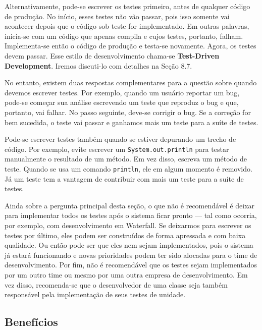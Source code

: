 \documentclass[
  11pt,
  twoside]{book}
\newcommand{\passthrough}[1]{#1}
\begin{document}
Alternativamente, pode-se escrever os testes primeiro, antes de qualquer
código de produção. No início, esses testes não vão passar, pois isso
somente vai acontecer depois que o código sob teste for implementado. Em
outras palavras, inicia-se com um código que apenas compila e cujos
testes, portanto, falham. Implementa-se então o código de produção e
testa-se novamente. Agora, os testes devem passar. Esse estilo de
desenvolvimento chama-se \textbf{Test-Driven Development}. Iremos
discuti-lo com detalhes na Seção 8.7.

No entanto, existem duas respostas complementares para a questão sobre
quando devemos escrever testes. Por exemplo, quando um usuário reportar
um bug, pode-se começar sua análise escrevendo um teste que reproduz o
bug e que, portanto, vai falhar. No passo seguinte, deve-se corrigir o
bug. Se a correção for bem sucedida, o teste vai passar e ganhamos mais
um teste para a suíte de testes.

Pode-se escrever testes também quando se estiver depurando um trecho de
código. Por exemplo, evite escrever um
\passthrough{\lstinline!System.out.println!} para testar manualmente o
resultado de um método. Em vez disso, escreva um método de teste. Quando
se usa um comando \passthrough{\lstinline!println!}, ele em algum
momento é removido. Já um teste tem a vantagem de contribuir com mais um
teste para a suíte de testes.

Ainda sobre a pergunta principal desta seção, o que não é recomendável é
deixar para implementar todos os testes após o sistema ficar pronto ---
tal como ocorria, por exemplo, com desenvolvimento em Waterfall. Se
deixarmos para escrever os testes por último, eles podem ser construídos
de forma apressada e com baixa qualidade. Ou então pode ser que eles nem
sejam implementados, pois o sistema já estará funcionando e novas
prioridades podem ter sido alocadas para o time de desenvolvimento. Por
fim, não é recomendável que os testes sejam implementados por um outro
time ou mesmo por uma outra empresa de desenvolvimento. Em vez disso,
recomenda-se que o desenvolvedor de uma classe seja também responsável
pela implementação de seus testes de unidade.

\hypertarget{benefuxedcios}{%
\subsection{Benefícios}\label{benefuxedcios}}

\end{document}
